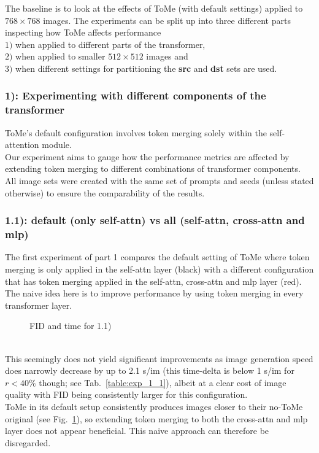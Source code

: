 The baseline is to look at the effects of ToMe (with default settings) applied to $768 \times 768$ images. The experiments can be split up into three different parts inspecting how ToMe affects performance\\ \(1)\) when applied to different parts of the transformer,\\ \(2)\) when applied to smaller $512 \times 512$ images and\\ \(3)\) when different settings for partitioning the \textbf{src} and \textbf{dst} sets are used.

\subsubsection*{1): Experimenting with different components of the transformer}
ToMe's default configuration involves token merging solely within the self-attention module.\\
Our experiment aims to gauge how the performance metrics are affected by extending token merging to different combinations of transformer components.\\
All image sets were created with the same set of prompts and seeds (unless stated otherwise) to ensure the comparability of the results.



\subsubsection*{1.1): default (only self-attn) vs all (self-attn, cross-attn and mlp)}
The first experiment of part 1 compares the default setting of ToMe where token merging is only applied in the self-attn layer (black) with a different configuration that has token merging applied in the self-attn, cross-attn and mlp layer (red). 
The naive idea here is to improve performance by using token merging in every transformer layer.
\begin{figure}[!htb]
\label{fig:exp_1_1}
   
   
\caption{FID and time for 1.1)}
\label{fig:exp_1_1}
\end{figure}\\
This seemingly does not yield significant improvements as image generation speed does narrowly decrease by up to 2.1 s/im (this time-delta is below 1 s/im for $r<40\%$ though; see Tab.~\ref{table:exp_1_1}), albeit at a clear cost of image quality with FID being consistently larger for this configuration. \\
ToMe in its default setup consistently produces images closer to their no-ToMe original (see Fig.~\ref{fig:exp_1_1}), so extending token merging to both the cross-attn and mlp layer does not appear beneficial. This naive approach can therefore be disregarded.



